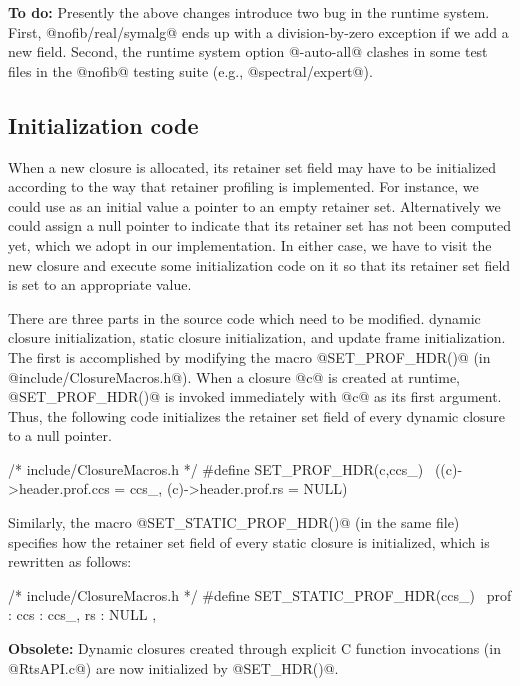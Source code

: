 \documentclass{article}
\begin{document}
\textbf{To do:} Presently the above changes introduce two bug in the 
runtime system. 
First, @nofib/real/symalg@ ends up with a division-by-zero
exception if we add a new field. 
Second, the runtime system option @-auto-all@ clashes in some test files
in the @nofib@ testing suite (e.g., @spectral/expert@).

\subsection{Initialization code}

When a new closure is allocated, its retainer set field may have to be 
initialized according to the way that retainer profiling is implemented.
For instance, we could use as an initial value a pointer to an empty retainer 
set. 
Alternatively we could assign a null pointer to indicate that its retainer
set has not been computed yet, which we adopt in our implementation.
In either case, we have to visit the new closure and execute some initialization
code on it so that its retainer set field is set to an appropriate value.

There are three parts in the source code which need to be modified.
dynamic closure initialization, static closure initialization,  
and update frame initialization.
The first is accomplished by modifying the macro @SET_PROF_HDR()@ (in 
@include/ClosureMacros.h@). When a closure  @c@ is created at runtime, 
@SET_PROF_HDR()@ is invoked immediately with @c@ as its first argument.
Thus, the following code initializes the retainer set field of every
dynamic closure to a null pointer.

\begin{code}
/* include/ClosureMacros.h */
#define SET_PROF_HDR(c,ccs_)            \
        ((c)->header.prof.ccs = ccs_, (c)->header.prof.rs = NULL)
\end{code}

Similarly, the macro @SET_STATIC_PROF_HDR()@ (in the
same file) specifies how the retainer set field of every static closure
is initialized, which is rewritten as follows:

\begin{code}
/* include/ClosureMacros.h */
#define SET_STATIC_PROF_HDR(ccs_)       \
        prof : { ccs : ccs_, rs : NULL },
\end{code}

\textbf{Obsolete:} Dynamic closures created through explicit C function invocations
(in @RtsAPI.c@) are now initialized by @SET_HDR()@.
\end{document}
